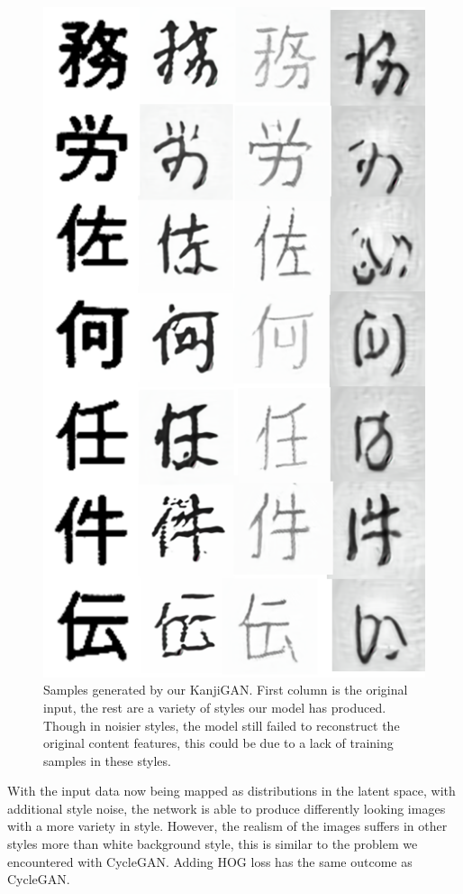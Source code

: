 \documentclass[12pt]{report}
\begin{document}
\begin{figure}[h]
	\centering
	\includegraphics[scale=0.9]{kanji-gan-results}
	\caption{Samples generated by our KanjiGAN. First column is the original input, the rest are a variety of styles our model has produced. Though in noisier styles, the model still failed to reconstruct the original content features, this could be due to a lack of training samples in these styles.}
	\label{fig:kanji-gan-results}
\end{figure}

With the input data now being mapped as distributions in the latent space, with additional style noise, the network is able to produce differently looking images with a more variety in style. However, the realism of the images suffers in other styles more than white background style, this is similar to the problem we encountered with CycleGAN. Adding HOG loss has the same outcome as CycleGAN. 
\end{document}
